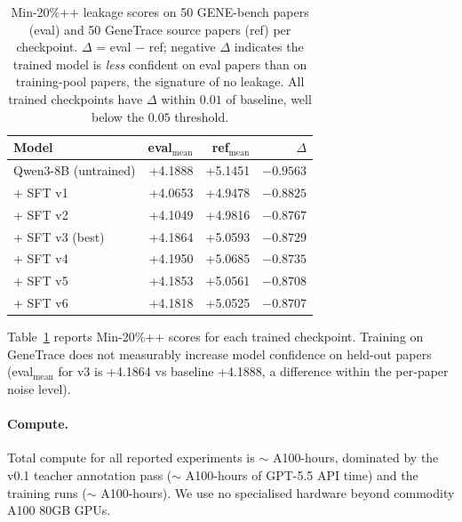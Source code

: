 \begin{table}[h]
  \centering
  \small
  \begin{tabular}{lrrr}
    \toprule
    Model & eval$_{\mathrm{mean}}$ & ref$_{\mathrm{mean}}$ & $\Delta$ \\
    \midrule
    Qwen3-8B (untrained)   & +4.1888 & +5.1451 & $-0.9563$ \\
    \quad + SFT v1         & +4.0653 & +4.9478 & $-0.8825$ \\
    \quad + SFT v2         & +4.1049 & +4.9816 & $-0.8767$ \\
    \quad + SFT v3 (best)  & +4.1864 & +5.0593 & $-0.8729$ \\
    \quad + SFT v4         & +4.1950 & +5.0685 & $-0.8735$ \\
    \quad + SFT v5         & +4.1853 & +5.0561 & $-0.8708$ \\
    \quad + SFT v6         & +4.1818 & +5.0525 & $-0.8707$ \\
    \bottomrule
  \end{tabular}
  \caption{Min-20\%++ leakage scores on 50 GENE-bench papers
  (eval) and 50 GeneTrace source papers (ref) per checkpoint.
  $\Delta$ = eval $-$ ref; negative $\Delta$ indicates the trained
  model is \emph{less} confident on eval papers than on
  training-pool papers, the signature of no leakage. All trained
  checkpoints have $\Delta$ within $0.01$ of baseline, well below
  the $0.05$ threshold.}
  \label{tab:leakage}
\end{table}

Table~\ref{tab:leakage} reports Min-20\%++ scores
\citep{shi2024minkpp} for each trained checkpoint. Training on
GeneTrace does not measurably increase model confidence on held-out
\geneexam{} papers (eval$_{\mathrm{mean}}$ for v3 is +4.1864 vs
baseline +4.1888, a difference within the per-paper noise level).

\paragraph{Compute.} Total compute for all reported experiments is
$\sim$ A100-hours, dominated by the v0.1 teacher annotation pass
($\sim$ A100-hours of GPT-5.5 API time) and the \evoopd{}
training runs ($\sim$ A100-hours). We use no specialised
hardware beyond commodity A100 80GB GPUs.
